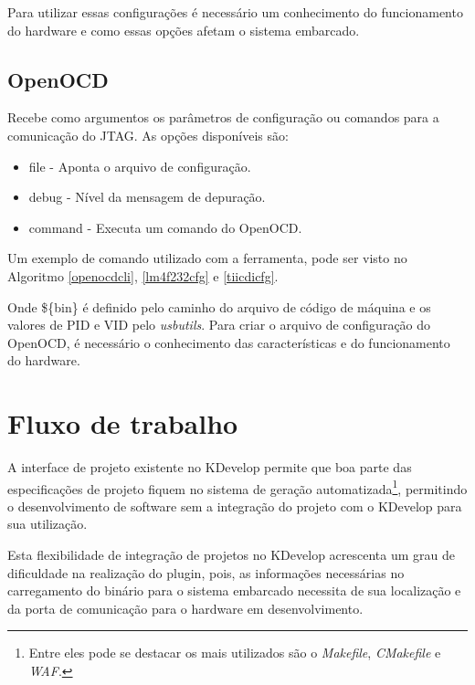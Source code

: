 Para utilizar essas configurações é necessário um conhecimento do funcionamento do hardware e como essas opções afetam o sistema embarcado. 

\subsection{OpenOCD}

Recebe como argumentos os parâmetros de configuração ou comandos para a comunicação do JTAG. As opções disponíveis são:

\begin{itemize}
\item {file} - Aponta o arquivo de configuração.
\item {debug} - Nível da mensagem de depuração.
\item {command} - Executa um comando do OpenOCD.
\end{itemize}

Um exemplo de comando utilizado com a ferramenta, pode ser visto no Algoritmo \ref{openocdcli}, \ref{lm4f232cfg} e \ref{tiicdicfg}.








Onde \$\{bin\} é definido pelo caminho do arquivo de código de máquina e os valores de PID e VID pelo \textit{usbutils}.
Para criar o arquivo de configuração do OpenOCD, é necessário o conhecimento das características e do funcionamento do hardware.

 \section{Fluxo de trabalho}

A interface de projeto existente no KDevelop permite que boa parte das especificações de projeto fiquem no sistema de geração automatizada\footnote{Entre eles pode se destacar os mais utilizados são o \textit{Makefile}, \textit{CMakefile} e \textit{WAF}.}, permitindo o desenvolvimento de software sem a integração do projeto com o KDevelop para sua utilização.

Esta flexibilidade de integração de projetos no KDevelop acrescenta um grau de dificuldade na realização do plugin, pois, as informações necessárias no carregamento do binário para o sistema embarcado necessita de sua localização e da porta de comunicação para o hardware em desenvolvimento. %

